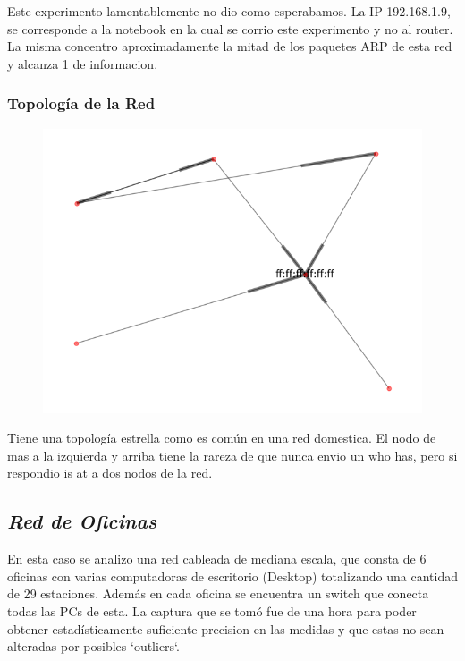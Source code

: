 Este experimento lamentablemente no dio como esperabamos. La IP 192.168.1.9, se corresponde
a la notebook en la cual se corrio este experimento y no al router. La misma concentro aproximadamente
la mitad de los paquetes ARP de esta red y alcanza 1 de informacion.

\subsubsection{Topolog\'ia de la Red}
\begin{figure}[hp!]
	\begin{center}
	 \includegraphics[scale=0.6]{../plots/mauro_s2_topologia.png}
	\end{center}
\end{figure}

Tiene una topolog\'ia estrella como es com\'un en una red domestica. El nodo de mas a la izquierda y
arriba tiene la rareza de que nunca envio un who has, pero si respondio is at a dos nodos de la red.

\subsection{\emph{Red de Oficinas}}

En esta caso se analizo una red cableada de mediana escala, que consta de 6
oficinas con varias computadoras de escritorio (Desktop) totalizando una
cantidad de 29 estaciones. Además en cada oficina se encuentra un switch que
conecta todas las PCs de esta. La captura que se tomó fue de una hora para
poder obtener estadísticamente suficiente precision en las medidas y que estas
no sean alteradas por posibles `outliers`.

